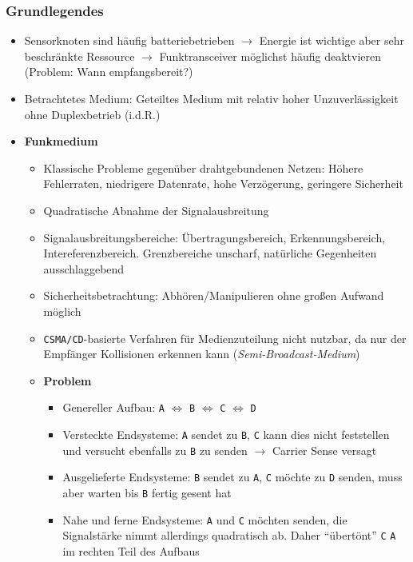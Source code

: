 \subsubsection{Grundlegendes}
\begin{itemize}
	\item Sensorknoten sind häufig batteriebetrieben \(\rightarrow\) Energie ist wichtige aber sehr beschränkte Ressource \(\rightarrow\) Funktransceiver möglichst häufig deaktvieren (Problem: Wann empfangsbereit?)
	\item Betrachtetes Medium: Geteiltes Medium mit relativ hoher Unzuverlässigkeit ohne Duplexbetrieb (i.d.R.)
	\item \textbf{Funkmedium}
	\begin{itemize}
		\item Klassische Probleme gegenüber drahtgebundenen Netzen: Höhere Fehlerraten, niedrigere Datenrate, hohe Verzögerung, geringere Sicherheit
		\item Quadratische Abnahme der Signalausbreitung
		\item Signalausbreitungsbereiche: Übertragungsbereich, Erkennungsbereich, Intereferenzbereich. Grenzbereiche unscharf, natürliche Gegenheiten ausschlaggebend
		\item Sicherheitsbetrachtung: Abhören/Manipulieren ohne großen Aufwand möglich
		\item \texttt{CSMA/CD}-basierte Verfahren für Medienzuteilung nicht nutzbar, da nur der Empfänger Kollisionen erkennen kann (\textit{Semi-Broadcast-Medium})
		\item \textbf{Problem}
		\begin{itemize}
			\item Genereller Aufbau: \texttt{A} \(\Leftrightarrow\) \texttt{B} \(\Leftrightarrow\) \texttt{C} \(\Leftrightarrow\) \texttt{D}
			\item Versteckte Endsysteme: \texttt{A} sendet zu \texttt{B}, \texttt{C} kann dies nicht feststellen und versucht ebenfalls zu \texttt{B} zu senden \(\rightarrow\) Carrier Sense versagt
			\item Ausgelieferte Endsysteme: \texttt{B} sendet zu \texttt{A}, \texttt{C} möchte zu \texttt{D} senden, muss aber warten bis \texttt{B} fertig gesent hat
			\item Nahe und ferne Endsysteme: \texttt{A} und \texttt{C} möchten senden, die Signalstärke nimmt allerdings quadratisch ab. Daher "`übertönt"' \texttt{C} \texttt{A} im rechten Teil des Aufbaus
		\end{itemize}
	\end{itemize}

\end{itemize}
